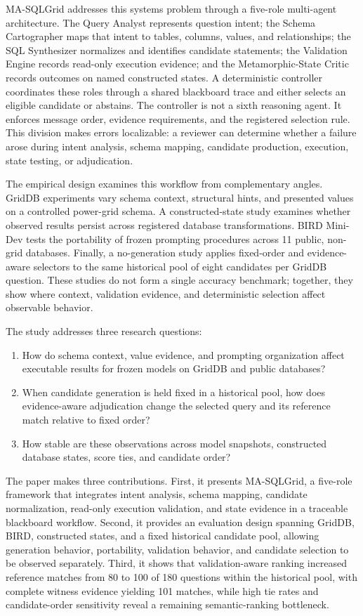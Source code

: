 \documentclass[applsci,article,submit,moreauthors]{Definitions/mdpi}
\newcommand{\masql}{MA-SQLGrid}
\begin{document}
\masql{} addresses this systems problem through a five-role multi-agent architecture. The Query Analyst represents question intent; the Schema Cartographer maps that intent to tables, columns, values, and relationships; the SQL Synthesizer normalizes and identifies candidate statements; the Validation Engine records read-only execution evidence; and the Metamorphic-State Critic records outcomes on named constructed states. A deterministic controller coordinates these roles through a shared blackboard trace and either selects an eligible candidate or abstains. The controller is not a sixth reasoning agent. It enforces message order, evidence requirements, and the registered selection rule. This division makes errors localizable: a reviewer can determine whether a failure arose during intent analysis, schema mapping, candidate production, execution, state testing, or adjudication.

The empirical design examines this workflow from complementary angles. GridDB experiments vary schema context, structural hints, and presented values on a controlled power-grid schema. A constructed-state study examines whether observed results persist across registered database transformations. BIRD Mini-Dev tests the portability of frozen prompting procedures across 11 public, non-grid databases. Finally, a no-generation study applies fixed-order and evidence-aware selectors to the same historical pool of eight candidates per GridDB question. These studies do not form a single accuracy benchmark; together, they show where context, validation evidence, and deterministic selection affect observable behavior.

The study addresses three research questions:
\begin{enumerate}
\item How do schema context, value evidence, and prompting organization affect executable results for frozen models on GridDB and public databases?
\item When candidate generation is held fixed in a historical pool, how does evidence-aware adjudication change the selected query and its reference match relative to fixed order?
\item How stable are these observations across model snapshots, constructed database states, score ties, and candidate order?
\end{enumerate}

The paper makes three contributions. First, it presents \masql{}, a five-role framework that integrates intent analysis, schema mapping, candidate normalization, read-only execution validation, and state evidence in a traceable blackboard workflow. Second, it provides an evaluation design spanning GridDB, BIRD, constructed states, and a fixed historical candidate pool, allowing generation behavior, portability, validation behavior, and candidate selection to be observed separately. Third, it shows that validation-aware ranking increased reference matches from 80 to 100 of 180 questions within the historical pool, with complete witness evidence yielding 101 matches, while high tie rates and candidate-order sensitivity reveal a remaining semantic-ranking bottleneck.
\end{document}
